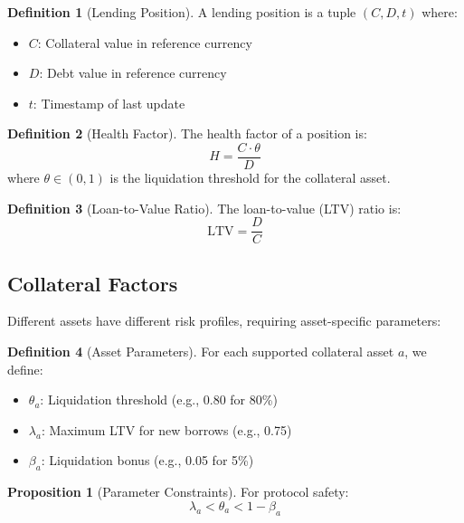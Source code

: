 \documentclass[11pt,a4paper]{article}
\theoremstyle{definition}
\newtheorem{definition}{Definition}
\newtheorem{proposition}{Proposition}
\begin{document}
\begin{definition}[Lending Position]
A lending position is a tuple $(C, D, t)$ where:
\begin{itemize}
\item $C$: Collateral value in reference currency
\item $D$: Debt value in reference currency
\item $t$: Timestamp of last update
\end{itemize}
\end{definition}

\begin{definition}[Health Factor]
The health factor of a position is:
\begin{equation}
H = \frac{C \cdot \theta}{D}
\end{equation}
where $\theta \in (0, 1)$ is the liquidation threshold for the collateral asset.
\end{definition}

\begin{definition}[Loan-to-Value Ratio]
The loan-to-value (LTV) ratio is:
\begin{equation}
\text{LTV} = \frac{D}{C}
\end{equation}
\end{definition}

\subsection{Collateral Factors}

Different assets have different risk profiles, requiring asset-specific parameters:

\begin{definition}[Asset Parameters]
For each supported collateral asset $a$, we define:
\begin{itemize}
\item $\theta_a$: Liquidation threshold (e.g., 0.80 for 80\%)
\item $\lambda_a$: Maximum LTV for new borrows (e.g., 0.75)
\item $\beta_a$: Liquidation bonus (e.g., 0.05 for 5\%)
\end{itemize}
\end{definition}

\begin{proposition}[Parameter Constraints]
For protocol safety:
\begin{equation}
\lambda_a < \theta_a < 1 - \beta_a
\end{equation}
\end{proposition}
\end{document}
